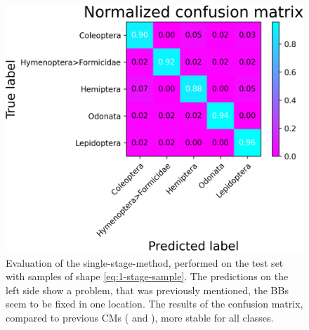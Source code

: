 \begin{figure}
\begin{multicols}{2}
\begin{minipage}{.45\textwidth}
            \includegraphics[width=\textwidth]{images/two-in-one-model-confusion.png}
        \end{minipage}
    \end{multicols}
    \caption{Evaluation of the single-stage-method, performed on the test set with samples of shape \eqref{eq:1-stage-sample}. The predictions on the left side show a problem, that was previously mentioned, the BBs seem to be fixed in one location. The results of the confusion matrix, compared to previous CMs ( and ), more stable for all classes.}
    \label{fig:single-stage-predictions}
\end{figure}

